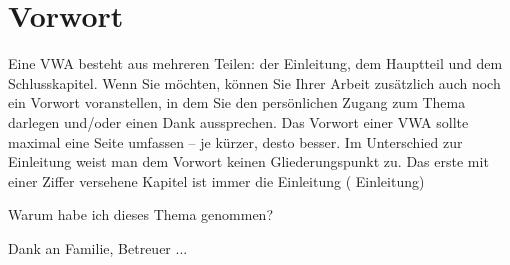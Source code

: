 \chapter*{Vorwort}
\label{cha:vorwort}

Eine VWA besteht aus mehreren Teilen: der Einleitung, dem Hauptteil und dem Schlusskapitel. Wenn Sie möchten, können Sie Ihrer Arbeit zusätzlich auch noch ein Vorwort voranstellen, in dem Sie den persönlichen Zugang zum Thema darlegen und/oder einen Dank aussprechen. Das Vorwort einer VWA sollte maximal eine Seite umfassen – je kürzer, desto besser. Im Unterschied zur Einleitung weist man dem Vorwort keinen Gliederungspunkt zu. Das erste mit einer Ziffer versehene Kapitel ist immer die Einleitung ( Einleitung\grqq)

Warum habe ich dieses Thema genommen?

Dank an Familie, Betreuer ...
